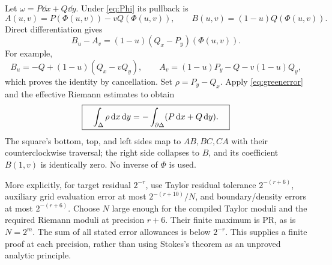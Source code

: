 Let $\omega=P\dd x+Q\dd y$. Under \eqref{eq:Phi} its pullback is
\begin{equation}\label{eq:pullback}
A(u,v)=P(\Phi(u,v))-vQ(\Phi(u,v)),\qquad
B(u,v)=(1-u)Q(\Phi(u,v)).
\end{equation}
Direct differentiation gives
\begin{equation}\label{eq:pullbackcurl}
B_u-A_v=(1-u)(Q_x-P_y)(\Phi(u,v)).
\end{equation}
For example,
\[
B_u=-Q+(1-u)(Q_x-vQ_y),\qquad
A_v=(1-u)P_y-Q-v(1-u)Q_y,
\]
which proves the identity by cancellation. Set $\rho=P_y-Q_x$. Apply \eqref{eq:greenerror} and the effective Riemann estimates to obtain
\begin{equation}\label{eq:Green}
\boxed{\quad\int_\Delta\rho\,\mathrm d x\,\mathrm d y
=-\int_{\partial\Delta}(P\,\mathrm d x+Q\,\mathrm d y).\quad}
\end{equation}
The square's bottom, top, and left sides map to $AB,BC,CA$ with their counterclockwise traversal; the right side collapses to $B$, and its coefficient $B(1,v)$ is identically zero. No inverse of $\Phi$ is used.

More explicitly, for target residual $2^{-r}$, use Taylor residual tolerance $2^{-(r+6)}$, auxiliary grid evaluation error at most $2^{-(r+10)}/N$, and boundary/density errors at most $2^{-(r+6)}$. Choose $N$ large enough for the compiled Taylor moduli and the required Riemann moduli at precision $r+6$. Their finite maximum is PR, as is $N=2^m$. The sum of all stated error allowances is below $2^{-r}$. This supplies a finite proof at each precision, rather than using Stokes's theorem as an unproved analytic principle.
